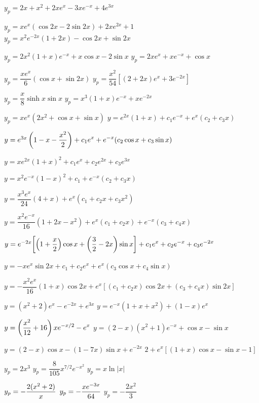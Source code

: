  $y_p=2x+x^2+2xe^x-3xe^{-x}+4e^{3x}$

 $y_p=xe^x(\cos2x-2\sin2x)+2xe^{2x}+1$
 $y_p=x^2e^{-2x}(1+2x)-\cos2x+\sin2x$

 $y_p=2x^2(1+x)e^{-x}+x\cos x-2\sin x$
 $y_p=2xe^x+xe^{-x}+\cos x$

 $y_p=\dfrac{xe^x}{6}(\cos x+\sin2x)$
$y_p=\dfrac{x^2}{54}[(2+2x)e^x+3e^{-2x}]$

 $y_p=\dfrac{x}{8}\sinh x\sin x$
 $y_p=x^3(1+x)e^{-x}+xe^{-2x}$

 $y_p=xe^x(2x^2+\cos x+\sin x)$
  $y=e^{2x}(1+x)+c_1e^{-x}+e^x(c_2+c_3x)$

 $y=e^{3x}\displaystyle\left(1-x-\frac{x^2}{2}\right)+
c_1e^x+e^{-x}(c_2\cos x+c_3\sin x)$

 $y=xe^{2x}(1+x)^2+c_1e^x+c_2e^{2x}+c_3e^{3x}$

 $y=x^2e^{-x}(1-x)^2+c_1
+e^{-x}(c_2+c_3x)$

 $y=\dfrac{x^3e^x}{24}(4+x)
+e^x(c_1+c_2x+c_3x^2)$

   $y=\dfrac{x^2e^{-x}}{16}(1+2x-x^2)
+e^x(c_1+c_2x)+e^{-x}(c_3+c_4x)$

 $y=e^{-2x}\displaystyle{\left[\left(1+\frac{x}{2}\right)
\cos x+\left(\frac{3}{2}-2x\right)\sin x\right]}
+c_1e^x+c_2e^{-x}+c_3e^{-2x}$

 $y=-xe^x\sin2x+c_1+c_2e^x
+e^x(c_3\cos x+c_4\sin x)$

 $y=-\dfrac{x^2e^x}{16}(1+x)\cos2x
+e^x\left[(c_1+c_2x)\cos2x+(c_3+c_4x)\sin2x\right]$

 $y=(x^2+2)e^x-e^{-2x}+e^{3x}$
 $y=e^{-x}(1+x+x^2) +(1-x)e^x$

 $y=\displaystyle\left(\frac{x^2}{12}+16\right)xe^{-x/2}
-e^x$
 $y=(2-x)(x^2+1)e^{-x}+\cos x-\sin x$

 $y=(2-x)\cos x-(1-7x)\sin x+e^{-2x}$
 $2 +e^x\left[(1+x)\cos x-\sin x-1\right]$



  $y_p=2x^3$
 $y_p=\dfrac{8}{105}x^{7/2} e^{-x^2}$
 $y_p=x\ln|x|$

 $y_p=\displaystyle{-\frac{2(x^2+2)}{x}}$
 $y_p=\displaystyle{-\frac{xe^{-3x}}{64}}$
 $y_p=-\dfrac{2x^2}{3}$

